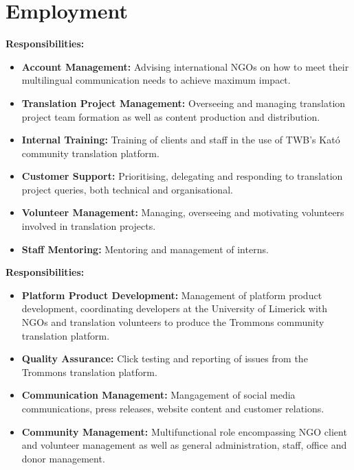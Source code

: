 \documentclass[a4paper,11pt]{moderncv}
\begin{document}
\maketitle

\section{Employment}

{
  \textbf{Responsibilities:}
  \begin{itemize}
  \item \textbf{Account Management:} Advising international NGOs on how to meet their multilingual communication needs to achieve maximum impact.
  \item \textbf{Translation Project Management:} Overseeing and managing translation project team formation as well as content production and distribution.
  \item \textbf{Internal Training:} Training of clients and staff in the use of TWB's Kató community translation platform.
  \item \textbf{Customer Support:} Prioritising, delegating and responding to translation project queries, both technical and organisational.
  \item \textbf{Volunteer Management:} Managing, overseeing and motivating volunteers involved in translation projects.
  \item \textbf{Staff Mentoring:} Mentoring and management of interns.
  \end{itemize}
}

{
  \textbf{Responsibilities:}
  \begin{itemize}
  \item \textbf{Platform Product Development:} Management of platform product development, coordinating developers at the University of Limerick with NGOs and translation volunteers to produce the Trommons community translation platform.
  \item \textbf{Quality Assurance:} Click testing and reporting of issues from the Trommons translation platform.
  \item \textbf{Communication Management:} Mangagement of social media communications, press releases, website content and customer relations.
  \item \textbf{Community Management:} Multifunctional role encompassing NGO client and volunteer management as well as general administration, staff, office and donor management.
  \end{itemize}
}
\end{document}

